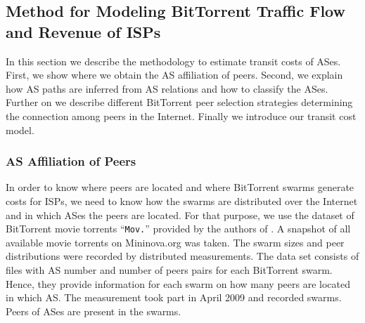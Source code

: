 \subsection{Method for Modeling BitTorrent Traffic Flow and Revenue of ISPs}\label{sec:p2p:methodology}

In this section we describe the methodology to estimate transit costs of ASes. First, we show where we obtain the AS affiliation of peers. Second, we explain how AS paths are inferred from AS relations and how to classify the ASes. Further on we describe different BitTorrent peer selection strategies determining the connection among peers in the Internet. Finally we introduce our transit cost model.

\subsubsection{AS Affiliation of Peers}

In order to know where peers are located and where BitTorrent swarms generate costs for ISPs, we need to know how the swarms are distributed over the Internet and in which ASes the peers are located. For that purpose, we use the dataset of BitTorrent movie torrents ``\texttt{Mov.}'' provided by the authors of \cite{Hossfeld2011}. A snapshot of all available movie torrents on Mininova.org was taken. The swarm sizes and peer distributions were recorded by distributed measurements. The data set consists of files with AS number and number of peers pairs for each BitTorrent swarm. Hence, they provide information for each swarm on how many peers are located in which AS.   The measurement took part in April 2009 and recorded  swarms. Peers of  ASes are present in the swarms.




